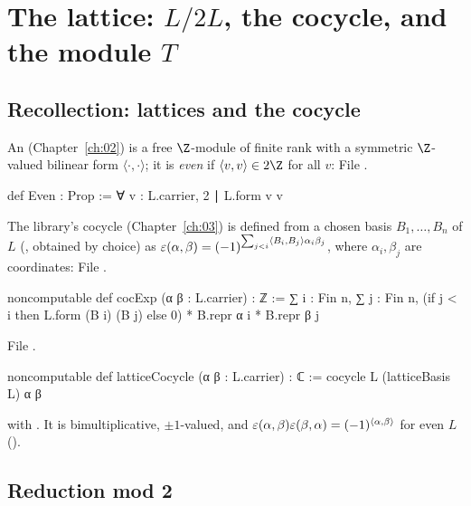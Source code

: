 \section{The lattice: \texorpdfstring{$L/2L$}{L/2L}, the cocycle, and the module \texorpdfstring{$T$}{T}}\label{ch06:sec:lattice}

\subsection{Recollection: lattices and the cocycle}

An  (Chapter~\ref{ch:02}) is a free $\Z$-module of finite rank with a
symmetric $\Z$-valued bilinear form $\langle\cdot,\cdot\rangle$; it is \emph{even} if
$\langle v,v\rangle\in2\Z$ for all $v$:
\noindent File .
\begin{leancode}
def Even : Prop := ∀ v : L.carrier, 2 ∣ L.form v v
\end{leancode}
The library's cocycle (Chapter~\ref{ch:03}) is defined from a chosen basis $B_1,\dots,B_n$ of $L$
(, obtained by choice) as
$\varepsilon(\alpha,\beta)=(-1)^{\sum_{j<i}\langle B_i,B_j\rangle\alpha_i\beta_j}$, where
$\alpha_i,\beta_j$ are coordinates:
\noindent File .
\begin{leancode}
noncomputable def cocExp (α β : L.carrier) : ℤ :=
  ∑ i : Fin n, ∑ j : Fin n,
    (if j < i then L.form (B i) (B j) else 0) * B.repr α i * B.repr β j
\end{leancode}
\noindent File .
\begin{leancode}
noncomputable def latticeCocycle (α β : L.carrier) : ℂ := cocycle L (latticeBasis L) α β
\end{leancode}
with .  It is bimultiplicative, $\pm1$-valued,
and $\varepsilon(\alpha,\beta)\varepsilon(\beta,\alpha)=(-1)^{\langle\alpha,\beta\rangle}$ for even $L$
().

\subsection{Reduction mod 2}


